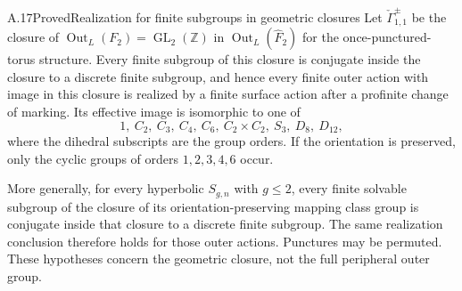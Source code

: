 \begin{statement}{A.17}{Proved}{Realization for finite subgroups in geometric closures}
Let $\check\Gamma_{1,1}^{\pm}$ be the closure of
$\operatorname{Out}_L(F_2)=\operatorname{GL}_2(\mathbb Z)$
in $\operatorname{Out}_L(\widehat F_2)$ for the
once-punctured-torus structure. Every finite subgroup of this
closure is conjugate inside the closure to a discrete finite
subgroup, and hence every finite outer action with image in
this closure is realized by a finite surface action after a
profinite change of marking. Its effective image is isomorphic
to one of
\[
 1,\ C_2,\ C_3,\ C_4,\ C_6,\ C_2\times C_2,\ S_3,\ D_8,\ D_{12},
\]
where the dihedral subscripts are the group orders. If the
orientation is preserved, only the cyclic groups of orders
$1,2,3,4,6$ occur.

More generally, for every hyperbolic $S_{g,n}$ with $g\le2$,
every finite solvable subgroup of the closure of its
orientation-preserving mapping class group is conjugate
inside that closure to a discrete finite subgroup. The same
realization conclusion therefore holds for those outer
actions. Punctures may be permuted. These hypotheses concern
the geometric closure, not the full peripheral outer group.
\end{statement}
